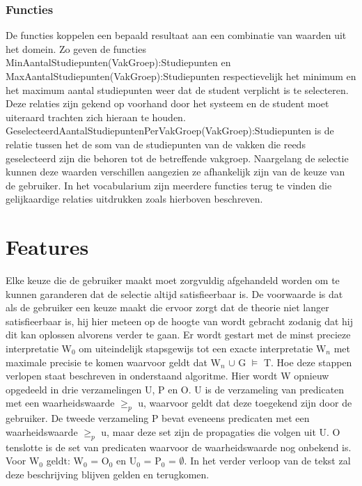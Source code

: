 \subsubsection{Functies}
De functies koppelen een bepaald resultaat aan een combinatie van waarden uit het domein. Zo geven de functies MinAantalStudiepunten(VakGroep):Studiepunten en MaxAantalStudiepunten(VakGroep):Studiepunten respectievelijk het minimum en het maximum aantal studiepunten weer dat de student verplicht is te selecteren. Deze relaties zijn gekend op voorhand door het systeem en de student moet uiteraard trachten zich hieraan te houden. GeselecteerdAantalStudiepuntenPerVakGroep(VakGroep):Studiepunten is de relatie tussen het de som van de studiepunten van de vakken die reeds geselecteerd zijn die behoren tot de betreffende vakgroep. Naargelang de selectie kunnen deze waarden verschillen aangezien ze afhankelijk zijn van de keuze van de gebruiker. In het vocabularium zijn meerdere functies terug te vinden die gelijkaardige relaties uitdrukken zoals hierboven beschreven. 


\section{Features}

Elke keuze die de gebruiker maakt moet zorgvuldig afgehandeld worden om te kunnen garanderen dat de selectie altijd satisfieerbaar is. De voorwaarde is dat als de gebruiker een keuze maakt die ervoor zorgt dat de theorie niet langer satisfieerbaar is, hij hier meteen op de hoogte van wordt gebracht zodanig dat hij dit kan oplossen alvorens verder te gaan. Er wordt gestart met de minst precieze interpretatie W$_{0}$ om uiteindelijk stapsgewijs tot een exacte interpretatie W$_{n}$ met maximale precisie te komen waarvoor geldt dat W$_{n}$ $\cup$ G $\models$ T. Hoe deze stappen verlopen staat beschreven in onderstaand algoritme. Hier wordt W opnieuw opgedeeld in drie verzamelingen U, P en O. U is de verzameling van predicaten met een waarheidswaarde $\geq_{p}$ u, waarvoor geldt dat deze toegekend zijn door de gebruiker. De tweede verzameling P bevat eveneens predicaten met een waarheidswaarde $\geq_{p}$ u, maar deze set zijn de propagaties die volgen uit U. O tenslotte is de set van predicaten waarvoor de waarheidswaarde nog onbekend is. Voor W$_{0}$ geldt: W$_{0}$ = O$_{0}$ en U$_{0}$ = P$_{0}$ = $\emptyset$. In het verder verloop van de tekst zal deze beschrijving blijven gelden en terugkomen.

